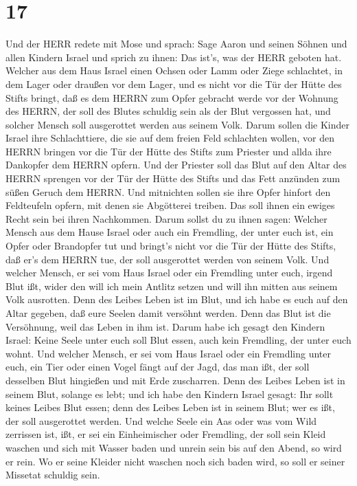 \hypertarget{section-16}{%
\section{17}\label{section-16}}

 Und der HERR redete mit Mose und sprach:  Sage
Aaron und seinen Söhnen und allen Kindern Israel und sprich zu ihnen:
Das ist's, was der HERR geboten hat.  Welcher aus dem Haus
Israel einen Ochsen oder Lamm oder Ziege schlachtet, in dem Lager oder
draußen vor dem Lager,  und es nicht vor die Tür der Hütte
des Stifts bringt, daß es dem HERRN zum Opfer gebracht werde vor der
Wohnung des HERRN, der soll des Blutes schuldig sein als der Blut
vergossen hat, und solcher Mensch soll ausgerottet werden aus seinem
Volk.  Darum sollen die Kinder Israel ihre Schlachttiere,
die sie auf dem freien Feld schlachten wollen, vor den HERRN bringen vor
die Tür der Hütte des Stifts zum Priester und allda ihre Dankopfer dem
HERRN opfern.  Und der Priester soll das Blut auf den Altar
des HERRN sprengen vor der Tür der Hütte des Stifts und das Fett
anzünden zum süßen Geruch dem HERRN.  Und mitnichten sollen
sie ihre Opfer hinfort den Feldteufeln opfern, mit denen sie Abgötterei
treiben. Das soll ihnen ein ewiges Recht sein bei ihren Nachkommen.
 Darum sollst du zu ihnen sagen: Welcher Mensch aus dem
Hause Israel oder auch ein Fremdling, der unter euch ist, ein Opfer oder
Brandopfer tut  und bringt's nicht vor die Tür der Hütte des
Stifts, daß er's dem HERRN tue, der soll ausgerottet werden von seinem
Volk.  Und welcher Mensch, er sei vom Haus Israel oder ein
Fremdling unter euch, irgend Blut ißt, wider den will ich mein Antlitz
setzen und will ihn mitten aus seinem Volk ausrotten.  Denn
des Leibes Leben ist im Blut, und ich habe es euch auf den Altar
gegeben, daß eure Seelen damit versöhnt werden. Denn das Blut ist die
Versöhnung, weil das Leben in ihm ist.  Darum habe ich
gesagt den Kindern Israel: Keine Seele unter euch soll Blut essen, auch
kein Fremdling, der unter euch wohnt.  Und welcher Mensch,
er sei vom Haus Israel oder ein Fremdling unter euch, ein Tier oder
einen Vogel fängt auf der Jagd, das man ißt, der soll desselben Blut
hingießen und mit Erde zuscharren.  Denn des Leibes Leben
ist in seinem Blut, solange es lebt; und ich habe den Kindern Israel
gesagt: Ihr sollt keines Leibes Blut essen; denn des Leibes Leben ist in
seinem Blut; wer es ißt, der soll ausgerottet werden.  Und
welche Seele ein Aas oder was vom Wild zerrissen ist, ißt, er sei ein
Einheimischer oder Fremdling, der soll sein Kleid waschen und sich mit
Wasser baden und unrein sein bis auf den Abend, so wird er rein.
 Wo er seine Kleider nicht waschen noch sich baden wird, so
soll er seiner Missetat schuldig sein.

